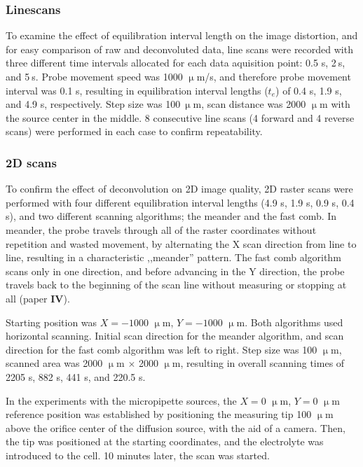 		\subsubsection{Linescans}

To examine the effect of equilibration interval length on the image distortion, and for easy comparison of raw and deconvoluted data, line scans were recorded with three different time intervals allocated for each data aquisition point: 0.5 s, 2$~$s, and 5$~$s.
Probe movement speed was 1000 $\upmu$m/s, and therefore probe movement interval was 0.1 s, resulting in equilibration interval lengths ($t_e$) of 0.4 s, 1.9 s, and 4.9 s, respectively.
Step size was 100$~\upmu$m, scan distance was 2000 $\upmu$m with the source center in the middle.
8 consecutive line scans (4 forward and 4 reverse scans) were performed in each case to confirm repeatability.

		\subsubsection{2D scans}
To confirm the effect of deconvolution on 2D image quality, 2D raster scans were performed with four different equilibration interval lengths (4.9 s, 1.9 s, 0.9 s, 0.4 s), and two different scanning algorithms; the meander and the fast comb.
In meander, the probe travels through all of the raster coordinates without repetition and wasted movement, by alternating the X scan direction from line to line, resulting in a characteristic ,,meander'' pattern.
The fast comb algorithm scans only in one direction, and before advancing in the Y direction, the probe travels back to the beginning of the scan line without measuring or stopping at all (paper \textbf{IV}).

Starting position was $X = -1000$ $\upmu$m, $Y = -1000$ $\upmu$m.
Both algorithms used horizontal scanning.
Initial scan direction for the meander algorithm, and scan direction for the fast comb algorithm was left to right.
Step size was 100 $\upmu$m, scanned area was 2000 $\upmu$m $\times$ 2000 $\upmu$m, resulting in overall scanning times of 2205 s, 882 s, 441 s, and 220.5 s.

In the experiments with the micropipette sources, the $X = 0$ $\upmu$m, $Y = 0$ $\upmu$m reference position was established by positioning the measuring tip 100 $\upmu$m above the orifice center of the diffusion source, with the aid of a camera.
Then, the tip was positioned at the starting coordinates, and the electrolyte was introduced to the cell.
10 minutes later, the scan was started. 

